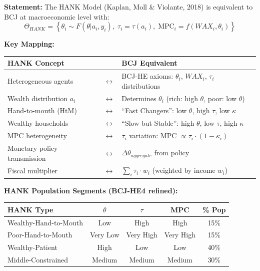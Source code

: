 \begin{tcolorbox}[colback=green!5!white, colframe=green!75!black,
    title=Theorem BCJ-T22: HANK (Heterogeneous Agent New Keynesian) as Special Case]
\textbf{Statement:} The HANK Model (Kaplan, Moll \& Violante, 2018) is equivalent to BCJ at macroeconomic level with:
\begin{equation}
\Theta_{HANK} = \left\{\theta_i \sim F(\theta | a_i, y_i), \; \tau_i = \tau(a_i), \; \text{MPC}_i = f(WAX_i, \theta_i)\right\}
\end{equation}

\textbf{Key Mapping:}
\begin{center}
\begin{tabular}{lcl}
\toprule
\textbf{HANK Concept} & & \textbf{BCJ Equivalent} \\
\midrule
Heterogeneous agents & $\leftrightarrow$ & BCJ-HE axioms: $\theta_i$, $WAX_i$, $\tau_i$ distributions \\
Wealth distribution $a_i$ & $\leftrightarrow$ & Determines $\theta_i$ (rich: high $\theta$, poor: low $\theta$) \\
Hand-to-mouth (HtM) & $\leftrightarrow$ & ``Fast Changers'': low $\theta$, high $\tau$, low $\kappa$ \\
Wealthy households & $\leftrightarrow$ & ``Slow but Stable'': high $\theta$, low $\tau$, high $\kappa$ \\
MPC heterogeneity & $\leftrightarrow$ & $\tau_i$ variation: MPC $\propto \tau_i \cdot (1-\kappa_i)$ \\
Monetary policy transmission & $\leftrightarrow$ & $\Delta\theta_{aggregate}$ from policy \\
Fiscal multiplier & $\leftrightarrow$ & $\sum_i \tau_i \cdot w_i$ (weighted by income $w_i$) \\
\bottomrule
\end{tabular}
\end{center}

\textbf{HANK Population Segments (BCJ-HE4 refined):}
\begin{center}
\begin{tabular}{lcccc}
\toprule
\textbf{HANK Type} & \textbf{$\theta$} & \textbf{$\tau$} & \textbf{MPC} & \textbf{\% Pop} \\
\midrule
Wealthy-Hand-to-Mouth & Low & High & High & 15\% \\
Poor-Hand-to-Mouth & Very Low & Very High & Very High & 15\% \\
Wealthy-Patient & High & Low & Low & 40\% \\
Middle-Constrained & Medium & Medium & Medium & 30\% \\
\bottomrule
\end{tabular}
\end{center}


\end{tcolorbox}
